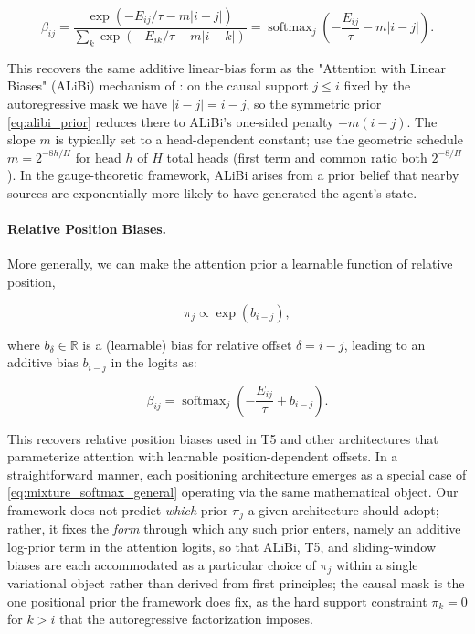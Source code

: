 \documentclass[twoside,11pt]{article}
\begin{document}
\begin{equation}
\beta_{ij} = \frac{\exp(-E_{ij}/\tau - m|i-j|)}{\sum_k \exp(-E_{ik}/\tau - m|i-k|)} = \operatorname{softmax}_j \left(-\frac{E_{ij}}{\tau} - m|i - j|\right).
\label{eq:alibi_attention}
\end{equation}

This recovers the same additive linear-bias form as the "Attention with Linear Biases" (ALiBi) mechanism of \citet{press2022train}: on the causal support $j \leq i$ fixed by the autoregressive mask we have $|i-j| = i-j$, so the symmetric prior \eqref{eq:alibi_prior} reduces there to ALiBi's one-sided penalty $-m(i-j)$. The slope $m$ is typically set to a head-dependent constant; \citet{press2022train} use the geometric schedule $m = 2^{-8h/H}$ for head $h$ of $H$ total heads (first term and common ratio both $2^{-8/H}$). In the gauge-theoretic framework, ALiBi arises from a prior belief that nearby sources are exponentially more likely to have generated the agent's state.

\paragraph{Relative Position Biases.}
More generally, we can make the attention prior a learnable function of relative position,

\begin{equation}
\pi_j \propto \exp(b_{i-j}),
\label{eq:relative_bias_prior}
\end{equation}

where $b_\delta \in \mathbb{R}$ is a (learnable) bias for relative offset $\delta = i - j$, leading to an additive bias $b_{i-j}$ in the logits as:

\begin{equation}
\beta_{ij} = \operatorname{softmax}_j \left(-\frac{E_{ij}}{\tau} + b_{i-j}\right).
\label{eq:relative_bias_attention}
\end{equation}

This recovers relative position biases used in T5 \citep{raffel2020exploring} and other architectures that parameterize attention with learnable position-dependent offsets. In a straightforward manner, each positioning architecture emerges as a special case of \eqref{eq:mixture_softmax_general} operating via the same mathematical object. Our framework does not predict \emph{which} prior $\pi_j$ a given architecture should adopt; rather, it fixes the \emph{form} through which any such prior enters, namely an additive log-prior term in the attention logits, so that ALiBi, T5, and sliding-window biases are each accommodated as a particular choice of $\pi_j$ within a single variational object rather than derived from first principles; the causal mask is the one positional prior the framework does fix, as the hard support constraint $\pi_k = 0$ for $k > i$ that the autoregressive factorization imposes.
\end{document}
